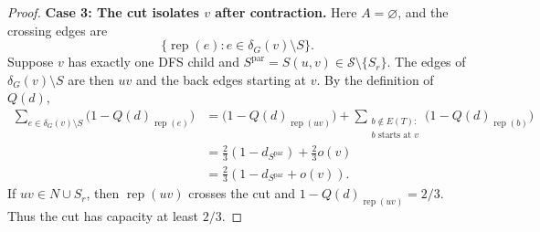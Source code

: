 \documentclass[11pt]{amsart}
\newcommand{\rep}[1]{\operatorname{rep}(#1)}
\newcommand{\1}{\mathbbm{1}}
\begin{document}
\begin{proof}
\smallskip\noindent
\textbf{Case 3: The cut isolates $v$ after contraction.}
Here $A=\varnothing$, and the crossing edges are
\[
 \{\rep{e}:e\in\delta_G(v)\setminus S\}.
\]
Suppose $v$ has exactly one DFS child and
$S^{\mathrm{par}}=S(u,v)\in\mathcal S\setminus\{S_r\}$.
The edges of $\delta_G(v)\setminus S$ are then $uv$ and
the back edges starting at $v$. By the definition of ${Q(d)}$,
\[
 \begin{aligned}
 \sum_{e\in\delta_G(v)\setminus S}
       \bigl(1-{Q(d)}_{\rep{e}}\bigr)
 &=\bigl(1-{Q(d)}_{\rep{uv}}\bigr)
   +\sum_{\substack{b\notin E(T):\\b\text{ starts at }v}}
       \bigl(1-{Q(d)}_{\rep{b}}\bigr)\\
 &=\frac23(1-d_{S^{\mathrm{par}}})+\frac23o(v)\\
 &=\frac23(1-d_{S^{\mathrm{par}}}+o(v)).
 \end{aligned}
\]
If $uv\in N\cup S_r$, then $\rep{uv}$ crosses the cut
and $1-{Q(d)}_{\rep{uv}}=2/3$. Thus the cut has capacity
at least $2/3$.


\end{proof}
\end{document}
